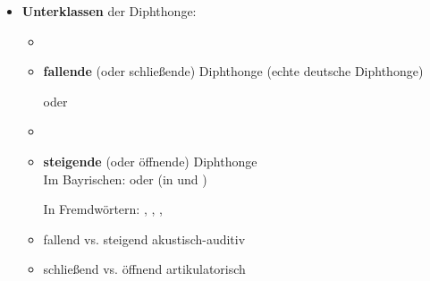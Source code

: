 \begin{frame}

	\begin{itemize}
		\item \textbf{Unterklassen} der Diphthonge:
		
		\begin{itemize}
			\item[]
			\item \textbf{fallende} (oder schließende) Diphthonge (echte deutsche Diphthonge)

			\ea {} oder 
			\z

			\item[]
			\item \textbf{steigende} (oder öffnende) Diphthonge\\

			\ea Im Bayrischen: \textipa{[ \t{ɪa} , \t{ʊa} ]} oder  (in  und )
			\z
			
			\ea In Fremdwörtern: , , , 
			\z
			
			\item fallend vs. steigend \ras akustisch-auditiv
			\item schließend vs. öffnend \ras artikulatorisch
		\end{itemize}
		
	\end{itemize}
	
\end{frame}



